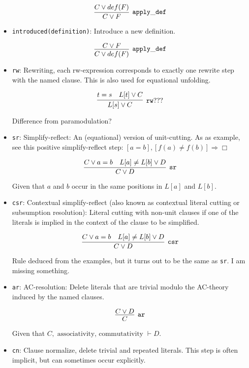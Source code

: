 \documentclass[a4paper, 11pt]{article}
\begin{document}
\begin{itemize}
  \[
  \infer[\mathtt{apply\_def}]{C \vee F}{
    C \vee def(F)
  }
  \]

\item \texttt{introduced(definition)}: 
  Introduce a new definition.

  \[
  \infer[\mathtt{apply\_def}]{C \vee def(F)}{
    C \vee F
  }
  \]

\item \texttt{rw}: 
  Rewriting, each rw-expression corresponds to exactly one
  rewrite step with the named clause. This is also used for equational unfolding.

  \[
  \infer[\mathtt{rw}???]{L[s] \vee C}{
    t = s &
    L[t] \vee C
  }
  \]
  
  {\color{red}Difference from paramodulation?}

\item \texttt{sr}: 
  Simplify-reflect: An (equational) version of unit-cutting. As
  as example, see this positive simplify-reflect step: 
  \newline
  $[a = b], [f(a) \neq f(b)] \Rightarrow \Box $

  \[
  \infer[\mathtt{sr}]{C \vee D}{
    C \vee a = b &
    L[a] \neq L[b] \vee D
  }
  \]
  
  Given that $a$ and $b$ occur in the same positions in $L[a]$ and $L[b]$.

\item \texttt{csr}: 
  Contextual simplify-reflect (also known as contextual
  literal cutting or subsumption resolution): Literal cutting with non-unit
  clauses if one of the literals is implied in the context of the clause to be
  simplified.

  \[
  \infer[\mathtt{csr}]{C \vee D}{
    C \vee a = b &
    L[a] \neq L[b] \vee D
  }
  \]

  {\color{red}Rule deduced from the examples, but it turns out to be the same as
  \texttt{sr}. I am missing something.}

\item \texttt{ar}: 
  AC-resolution: Delete literals that are trivial modulo the
  AC-theory induced by the named clauses.

  \[
  \infer[\mathtt{ar}]{C}{C \vee D}
  \]

  Given that $C, \mbox{ associativity, commutativity } \vdash D$.

\item \texttt{cn}: 
  Clause normalize, delete trivial and repeated literals. This
  step is often implicit, but can sometimes occur explicitly.


\end{itemize}
\end{document}
